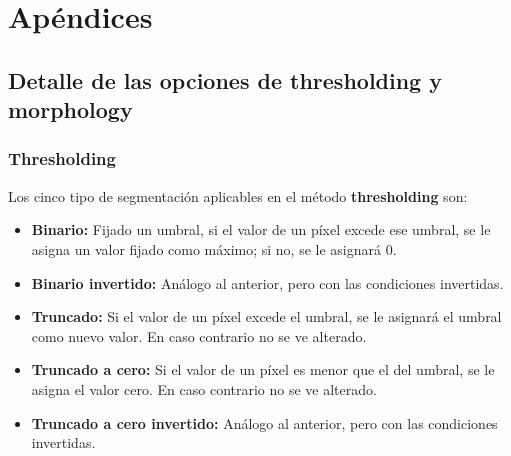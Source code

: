 \documentclass[a4paper,12pt]{article}
\begin{document}
\appendix
\section{Apéndices}
\subsection{Detalle de las opciones de thresholding y morphology}
\subsubsection{Thresholding}
\label{sec:thresh}
Los cinco tipo de segmentación aplicables en el método \textbf{thresholding} son:
\begin{itemize}
\item \textbf{Binario:} Fijado un umbral, si el valor de un píxel excede ese umbral, se le asigna un valor fijado como máximo; si no, se le asignará 0.
\item \textbf{Binario invertido:} Análogo al anterior, pero con las condiciones invertidas.
\item \textbf{Truncado:} Si el valor de un píxel excede el umbral, se le asignará el umbral como nuevo valor. En caso contrario no se ve alterado.
\item \textbf{Truncado a cero:} Si el valor de un píxel es menor que el del umbral, se le asigna el valor cero. En caso contrario no se ve alterado.
\item \textbf{Truncado a cero invertido:} Análogo al anterior, pero con las condiciones invertidas.
\end{itemize}
\end{document}
